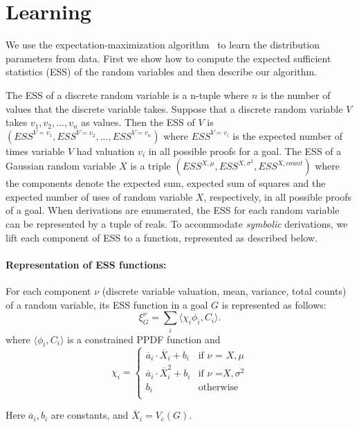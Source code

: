 \section{Learning}
\label{sec:Learning}

We use the expectation-maximization algorithm~\cite{DempsterEM} to learn the distribution parameters from data. First we show how to compute the expected sufficient statistics (ESS) of the random variables and then describe our algorithm.


The ESS of a discrete random variable is a n-tuple where $n$ is the
number of values that the discrete variable takes. Suppose that a
discrete random variable $V$ takes $v_{1}, v_{2}, ..., v_{n}$ as
values. Then the ESS of $V$ is $(ESS^{V=v_{1}}, ESS^{V=v_{2}}, ...,
ESS^{V=v_{n}})$ where $ESS^{V=v_{i}}$ is the expected number of times
variable $V$ had valuation $v_i$ in all possible proofs for a goal.  
The ESS of a Gaussian random variable $X$ is a triple $(ESS^{X,\mu},
ESS^{X,\sigma^{2}}, ESS^{X,count})$ where the components denote the
expected sum, expected sum of squares and the expected number of uses
of random variable $X$, respectively, in all possible proofs of a
goal.  When derivations are enumerated, the ESS for each random
variable can be represented by a tuple of reals.  To accommodate
\emph{symbolic} derivations, we lift each component of ESS to a
function, represented as described below.

\paragraph{Representation of ESS functions:}
For each component $\nu$ (discrete variable valuation, mean, variance, total counts) of a random variable, its ESS function in a goal $G$ is represented as follows:
\[
\xi^{\nu}_{G} = \sum_{i} \langle \chi_{i} \phi_{i}, C_{i} \rangle.
\]
where $\langle \phi_{i}, C_{i} \rangle$ is a constrained PPDF function and 
\[
\chi_{i}  = \left\{
\begin{array}{ll}
\overline{a}_{i} \cdot \overline{X}_{i}+b_{i} & \text{if $\nu$ = $X,\mu$}\\
\overline{a}_{i} \cdot \overline{X}_{i}^{2}+b_{i} & \text{if $\nu$ =$X,\sigma^2$}\\
b_{i}  & \text{otherwise}\\
\end{array}\right.
\]

\noindent
Here $\overline{a}_{i}, b_{i}$ are constants, and $\overline{X}_{i} = V_{c}(G)$. 

